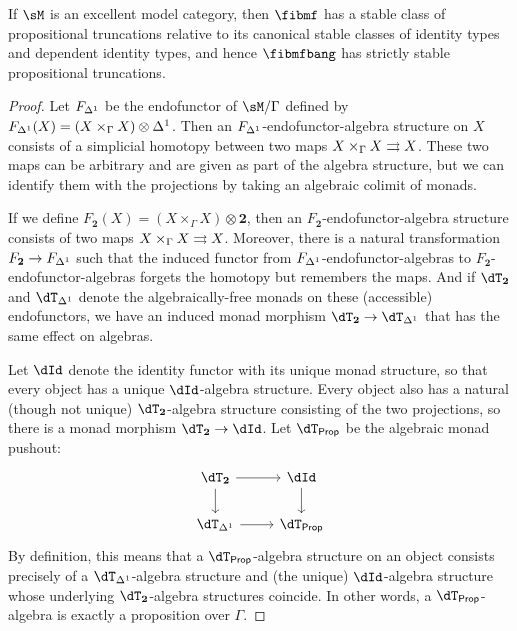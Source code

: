 \begin{enumerate}
\begin{thm}
  If $\sM$ is an excellent model category, then $\fibmf$ has a stable class of propositional truncations relative to its canonical stable classes of identity types and dependent identity types, and hence $\fibmfbang$ has strictly stable propositional truncations.
\end{thm}
\begin{proof}
  Let $F_{{\Delta^1}}$ be the endofunctor of $\sM/\Gamma$ defined by $F_{{\Delta^1}}(X) = (X \times_\Gamma X) \otimes {\Delta^1}$.
  Then an $F_{{\Delta^1}}$-endofunctor-algebra structure on $X$ consists of a simplicial homotopy between two maps $X \times_\Gamma X \rightrightarrows X$.
  These two maps can be arbitrary and are given as part of the algebra structure, but we can identify them with the projections by taking an algebraic colimit of monads.

  If we define $F_{\mathbf{2}}(X) = (X\times_\Gamma X) \otimes \mathbf{2}$, then an $F_{\mathbf{2}}$-endofunctor-algebra structure consists of two maps $X \times_\Gamma X \rightrightarrows X$.
  Moreover, there is a natural transformation $F_{\mathbf{2}} \to F_{\Delta^1}$ such that the induced functor from $F_{{\Delta^1}}$-endofunctor-algebras to $F_{\mathbf{2}}$-endofunctor-algebras forgets the homotopy but remembers the maps.
  And if $\dT_{\mathbf{2}}$ and $\dT_\ivl$ denote the algebraically-free monads on these (accessible) endofunctors, we have an induced monad morphism $\dT_{\mathbf{2}} \to \dT_\ivl$ that has the same effect on algebras.

  Let $\dId$ denote the identity functor with its unique monad structure, so that every object has a unique $\dId$-algebra structure.
  Every object also has a natural (though not unique) $\dT_{\mathbf{2}}$-algebra structure consisting of the two projections, so there is a monad morphism $\dT_{\mathbf{2}} \to \dId$.
  Let $\dtprop$ be the algebraic monad pushout:
  \[
  \begin{tikzcd}
    \dT_{\mathbf{2}} \ar[r] \ar[d] & \dId \ar[d] \\ \dT_{\ivl} \ar[r] & \dtprop
  \end{tikzcd}
  \]
  By definition, this means that a $\dtprop$-algebra structure on an object consists precisely of a $\dT_{\ivl}$-algebra structure and (the unique) $\dId$-algebra structure whose underlying $\dT_{\mathbf{2}}$-algebra structures coincide.
  In other words, a $\dtprop$-algebra is exactly a proposition over $\Gamma$.


\end{proof}
\end{enumerate}
